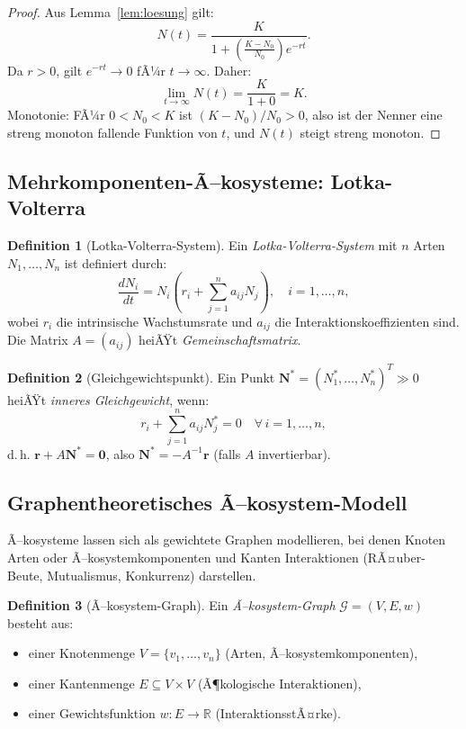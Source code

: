 ﻿\documentclass[a4paper,12pt]{article}
\theoremstyle{definition}
\newtheorem{definition}{Definition}
\begin{document}
\begin{proof}
	Aus Lemma~\ref{lem:loesung} gilt:
	\[
	N(t) = \frac{K}{1 + \left(\frac{K-N_0}{N_0}\right)e^{-rt}}.
	\]
	Da $r > 0$, gilt $e^{-rt} \to 0$ fÃ¼r $t \to \infty$. Daher:
	\[
	\lim_{t\to\infty} N(t) = \frac{K}{1 + 0} = K.
	\]
	Monotonie: FÃ¼r $0 < N_0 < K$ ist $(K - N_0)/N_0 > 0$, also ist der Nenner eine streng monoton fallende Funktion von $t$, und $N(t)$ steigt streng monoton. \qedhere
\end{proof}

\subsection{Mehrkomponenten-Ã–kosysteme: Lotka-Volterra}

\begin{definition}[Lotka-Volterra-System]
	Ein \emph{Lotka-Volterra-System} mit $n$ Arten $N_1, \ldots, N_n$ ist definiert durch:
	\[
	\frac{dN_i}{dt} = N_i \left( r_i + \sum_{j=1}^{n} a_{ij} N_j \right), \quad i = 1, \ldots, n,
	\]
	wobei $r_i$ die intrinsische Wachstumsrate und $a_{ij}$ die Interaktionskoeffizienten sind. Die Matrix $A = (a_{ij})$ heiÃŸt \emph{Gemeinschaftsmatrix}.
\end{definition}

\begin{definition}[Gleichgewichtspunkt]
	Ein Punkt $\mathbf{N}^* = (N_1^*, \ldots, N_n^*)^T \gg 0$ heiÃŸt \emph{inneres Gleichgewicht}, wenn:
	\[
	r_i + \sum_{j=1}^{n} a_{ij} N_j^* = 0 \quad \forall\, i = 1, \ldots, n,
	\]
	d.\,h. $\mathbf{r} + A\mathbf{N}^* = \mathbf{0}$, also $\mathbf{N}^* = -A^{-1}\mathbf{r}$ (falls $A$ invertierbar).
\end{definition}

\subsection{Graphentheoretisches Ã–kosystem-Modell}

Ã–kosysteme lassen sich als gewichtete Graphen modellieren, bei denen Knoten Arten oder Ã–kosystemkomponenten und Kanten Interaktionen (RÃ¤uber-Beute, Mutualismus, Konkurrenz) darstellen.

\begin{definition}[Ã–kosystem-Graph]
	Ein \emph{Ã–kosystem-Graph} $\mathcal{G} = (V, E, w)$ besteht aus:
	\begin{itemize}
		\item einer Knotenmenge $V = \{v_1, \ldots, v_n\}$ (Arten, Ã–kosystemkomponenten),
		\item einer Kantenmenge $E \subseteq V \times V$ (Ã¶kologische Interaktionen),
		\item einer Gewichtsfunktion $w: E \to \mathbb{R}$ (InteraktionsstÃ¤rke).
	\end{itemize}
\end{definition}
\end{document}
